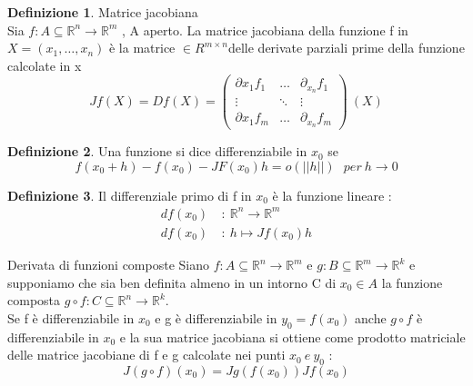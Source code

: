 \documentclass{article}
\theoremstyle{definition}
\newtheorem*{definizione}{Definizione}
\newcommand{\R}{\mathbb{R}}
\newcommand{\Rn}{\R^n}
\newcommand{\fnm}{f: A\subseteq \Rn \rightarrow \R^m}
\begin{document}
	\begin{definizione}
		Matrice jacobiana \\
		Sia $\fnm$ , A aperto. La matrice jacobiana della funzione f in $X=(x_1,\dots,x_n)$ è la matrice $\in R^{m\times n}$delle derivate parziali prime della funzione calcolate in x 
		$$Jf(X)=Df(X)=\begin{pmatrix}
			\partial{x_1}f_1 & \dots & \partial_{x_n}f_1\\
			\vdots & \ddots &\vdots \\
			\partial{x_1}f_m &\dots & \partial_{x_n}f_m
		\end{pmatrix} \ (X)$$
	\end{definizione}
	\begin{definizione}
		Una funzione si dice differenziabile in $x_0$ se 
		$$f(x_0+h)-f(x_0)-JF(x_0)h=o(||h||) \ \ \ per \ h\rightarrow 0$$
	\end{definizione}
	\begin{definizione}
		Il differenziale primo di f in $x_0$ è la funzione lineare : 
		\begin{align*}
			df(x_0) \ &: \ \Rn \rightarrow \R^m \\
			df(x_0) \ &: \ h \mapsto Jf(x_0)h
		\end{align*}
	\end{definizione}
	\begin{teo}{Derivata di funzioni composte }{}
		Siano $\fnm$ e $g:B\subseteq \R^m \rightarrow \R^k$ e supponiamo che sia ben definita almeno in un intorno C di $x_0 \in A$ la funzione composta $g \circ f : C \subseteq \Rn \rightarrow \R^k$. \\ Se f è differenziabile in $x_0$ e g è differenziabile in $y_0=f(x_0)$ anche $g \circ f$ è differenziabile in $x_0$ e la sua matrice jacobiana si ottiene come prodotto matriciale delle matrice jacobiane di f e g calcolate nei punti $x_0 \ e \ y_0$ :
		$$J(g \circ f)(x_0)=Jg(f(x_0))Jf(x_0)$$
	\end{teo}
\end{document}
